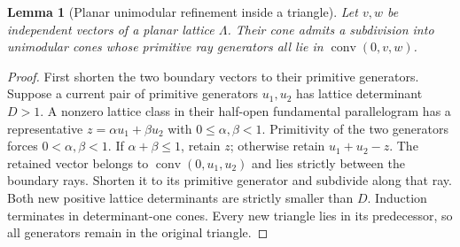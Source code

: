 \documentclass[11pt,a4paper]{article}
\newtheorem{lemma}[theorem]{Lemma}
\theoremstyle{remark}\newtheorem{remark}[theorem]{Remark}
\begin{document}
\begin{lemma}[Planar unimodular refinement inside a triangle]
\label{r4w:lem-fan}
Let $v,w$ be independent vectors of a planar lattice $\Lambda$.
Their cone admits a subdivision into unimodular cones whose primitive
ray generators all lie in $\operatorname{conv}(0,v,w)$.
\end{lemma}
\begin{proof}
First shorten the two boundary vectors to their primitive generators.
Suppose a current pair of primitive generators $u_1,u_2$ has lattice
determinant $D>1$. A nonzero lattice class in their half-open
fundamental parallelogram has a representative
$z=\alpha u_1+\beta u_2$ with $0\le\alpha,\beta<1$.
Primitivity of the two generators forces $0<\alpha,\beta<1$.
If $\alpha+\beta\le1$, retain $z$; otherwise retain $u_1+u_2-z$.
The retained vector belongs to $\operatorname{conv}(0,u_1,u_2)$
and lies strictly between the boundary rays. Shorten it to its
primitive generator and subdivide along that ray.
Both new positive lattice determinants are strictly smaller than $D$.
Induction terminates in determinant-one cones. Every new triangle
lies in its predecessor, so all generators remain in the original
triangle.
\end{proof}
\end{document}
